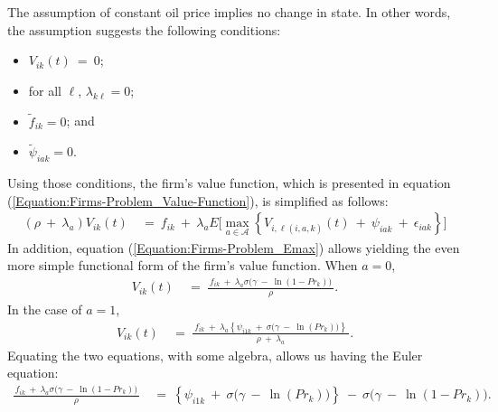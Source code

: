 The assumption of constant oil price implies no change in state. In other words, the assumption suggests the following conditions:
\begin{itemize}
    \item
    $V_{ik}(t) \ = \ 0$;
    
    \item
    for all $\ell$, $\lambda_{k\ell} = 0$;
    
    \item
    $\tilde{f}_{ik} = 0$; and
    
    \item
    $\tilde{\psi}_{iak} = 0$.
    
\end{itemize}

Using those conditions, the firm's value function, which is presented in equation (\ref{Equation:Firms-Problem_Value-Function}), is simplified as follows:
\begin{equation*}
\begin{split}
    (\rho \ + \ \lambda_{a}) V_{ik}(t) \
    & = \ f_{ik} \ + \ \lambda_{a} E\Big[ \underset{a \in \mathcal{A}}{\max} \left\{ V_{i,\ell(i, a, k)} (t) \ + \ \psi_{iak} \ + \ \epsilon_{iak} \right\} \Big]
\end{split}
\end{equation*}
In addition, equation (\ref{Equation:Firms-Problem_Emax}) allows yielding the even more simple functional form of the firm's value function. When $a = 0$,
\begin{equation*}
\begin{split}
    V_{ik} (t) \
    & = \ \frac{ \ f_{ik} \ + \ \lambda_{a} \sigma \big( \gamma \ - \ \ln(1 - Pr_{k}) \big) \ }{\rho}.
\end{split}
\end{equation*}
In the case of $a = 1$,
\begin{equation*}
\begin{split}
    V_{ik} (t) \
    & = \ \frac{ \ f_{ik} \ + \ \lambda_{a} \left\{ \psi_{i1k} \ + \ \sigma \big( \gamma \ - \ \ln(Pr_{k}) \big) \right\} \ }{\rho \ + \ \lambda_{a}}.
\end{split}
\end{equation*}
Equating the two equations, with some algebra, allows us having the Euler equation:
\begin{equation*}
\begin{split}
    \frac{ \ f_{ik} \ + \ \lambda_{a} \sigma \big( \gamma \ - \ \ln(1 - Pr_{k}) \big) \ }{\rho} \
    & = \ \left\{ \psi_{i1k} \ + \ \sigma \big( \gamma \ - \ \ln(Pr_{k}) \big) \right\} \ - \ \sigma \big( \gamma \ - \ \ln(1 - Pr_{k}) \big).
\end{split}
\end{equation*}
